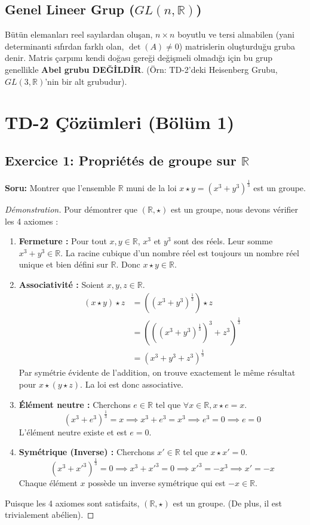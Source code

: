 \documentclass[12pt,a4paper]{report}
\begin{document}
\subsection*{Genel Lineer Grup ($GL(n, \mathbb{R})$)}
Bütün elemanları reel sayılardan oluşan, $n \times n$ boyutlu ve tersi alınabilen (yani determinanti sıfırdan farklı olan, $\det(A) \neq 0$) matrislerin oluşturduğu gruba denir. Matris çarpımı kendi doğası gereği değişmeli olmadığı için bu grup genellikle \textbf{Abel grubu DEĞİLDİR}. (Örn: TD-2'deki Heisenberg Grubu, $GL(3, \mathbb{R})$'nin bir alt grubudur).

\section{TD-2 Çözümleri (Bölüm 1)}

\subsection*{Exercice 1: Propriétés de groupe sur $\mathbb{R}$}
\textbf{Soru:} Montrer que l'ensemble $\mathbb{R}$ muni de la loi $x \star y = (x^3 + y^3)^{\frac{1}{3}}$ est un groupe.

\begin{proof}[Démonstration]
Pour démontrer que $(\mathbb{R}, \star)$ est un groupe, nous devons vérifier les 4 axiomes :
\begin{enumerate}
    \item \textbf{Fermeture :} Pour tout $x, y \in \mathbb{R}$, $x^3$ et $y^3$ sont des réels. Leur somme $x^3 + y^3 \in \mathbb{R}$. La racine cubique d'un nombre réel est toujours un nombre réel unique et bien défini sur $\mathbb{R}$. Donc $x \star y \in \mathbb{R}$.
    \item \textbf{Associativité :} Soient $x, y, z \in \mathbb{R}$.
    \begin{align*}
    (x \star y) \star z &= \left((x^3 + y^3)^{\frac{1}{3}}\right) \star z \\
    &= \left( \left((x^3 + y^3)^{\frac{1}{3}}\right)^3 + z^3 \right)^{\frac{1}{3}} \\
    &= (x^3 + y^3 + z^3)^{\frac{1}{3}}
    \end{align*}
    Par symétrie évidente de l'addition, on trouve exactement le même résultat pour $x \star (y \star z)$. La loi est donc associative.
    \item \textbf{Élément neutre :} Cherchons $e \in \mathbb{R}$ tel que $\forall x \in \mathbb{R}, x \star e = x$.
    \[ (x^3 + e^3)^{\frac{1}{3}} = x \implies x^3 + e^3 = x^3 \implies e^3 = 0 \implies e = 0 \]
    L'élément neutre existe et est $e = 0$.
    \item \textbf{Symétrique (Inverse) :} Cherchons $x' \in \mathbb{R}$ tel que $x \star x' = 0$.
    \[ (x^3 + x'^3)^{\frac{1}{3}} = 0 \implies x^3 + x'^3 = 0 \implies x'^3 = -x^3 \implies x' = -x \]
    Chaque élément $x$ possède un inverse symétrique qui est $-x \in \mathbb{R}$.
\end{enumerate}
Puisque les 4 axiomes sont satisfaits, $(\mathbb{R}, \star)$ est un groupe. (De plus, il est trivialement abélien).
\end{proof}
\end{document}
